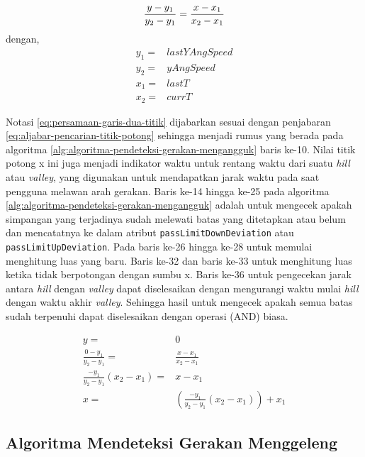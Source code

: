 \begin{equation}
		\frac{y-y_1}{y_2-y_1} = \frac{x-x_1}{x_2-x_1} \\
\label{eq:persamaan-garis-dua-titik}
\end{equation}
dengan,
\[
	\begin{split}
		y_1 = & lastYAngSpeed\\
		y_2 = & yAngSpeed\\
		x_1 = & lastT\\
		x_2 = & currT
	\end{split}
\]

Notasi \ref{eq:persamaan-garis-dua-titik} dijabarkan sesuai dengan penjabaran \ref{eq:aljabar-pencarian-titik-potong} sehingga menjadi rumus yang berada pada algoritma \ref{alg:algoritma-pendeteksi-gerakan-mengangguk} baris ke-10. Nilai titik potong x ini juga menjadi indikator waktu untuk rentang waktu dari suatu \textit{hill} atau \textit{valley}, yang digunakan untuk mendapatkan jarak waktu pada saat pengguna melawan arah gerakan. Baris ke-14 hingga ke-25 pada algoritma \ref{alg:algoritma-pendeteksi-gerakan-mengangguk} adalah untuk mengecek apakah simpangan yang terjadinya sudah melewati batas yang ditetapkan atau belum dan mencatatnya ke dalam atribut \texttt{passLimitDownDeviation} atau \texttt{passLimitUpDeviation}. Pada baris ke-26 hingga ke-28 untuk memulai menghitung luas yang baru. Baris ke-32 dan baris ke-33 untuk menghitung luas ketika tidak berpotongan dengan sumbu x. Baris ke-36 untuk pengecekan jarak antara \textit{hill} dengan \textit{valley} dapat diselesaikan dengan mengurangi waktu mulai \textit{hill} dengan waktu akhir \textit{valley}. Sehingga hasil untuk mengecek apakah semua batas sudah terpenuhi dapat diselesaikan dengan operasi (AND) biasa. 

\begin{equation}
	\begin{split}
		y = & 0\\		
		\frac{0-y_1}{y_2-y_1} = & \frac{x-x_1}{x_2-x_1} \\
		\frac{-y_1}{y_2-y_1} (x_2-x_1) = & x-x_1 \\
		x = & (\frac{-y_1}{y_2-y_1} (x_2-x_1)) +x_1
	\end{split}
\label{eq:aljabar-pencarian-titik-potong}
\end{equation}


\subsection{Algoritma Mendeteksi Gerakan Menggeleng}
\label{ssec:algoritma_mendeteksi_gerakan_menggeleng}

